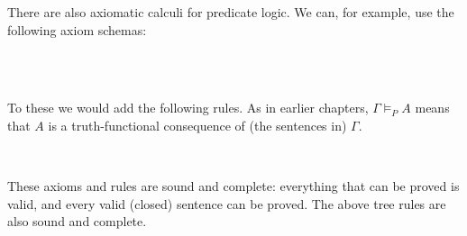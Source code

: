 There are also axiomatic calculi for predicate logic. We can, for example, use
the following axiom schemas:
%
\begin{principles}
  \\
  \\
\end{principles}
%
To these we would add the following rules. As in earlier chapters, $\Gamma \models_{P} A$ means that $A$ is a truth-functional consequence of (the sentences in) $\Gamma$.
\begin{principles}
  \\
\end{principles}


These axioms and rules are sound and complete: everything that can be proved is valid, and
every valid (closed) sentence can be proved. The above tree rules are also sound
and complete.

